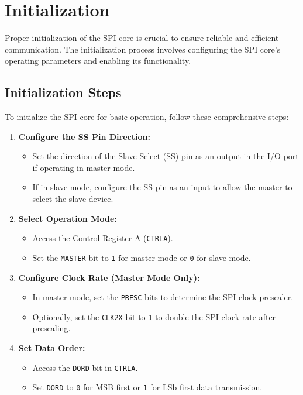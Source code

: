 \documentclass{article}
\begin{document}
\section{Initialization}
Proper initialization of the SPI core is crucial to ensure reliable and efficient communication. The initialization process involves configuring the SPI core's operating parameters and enabling its functionality.

\subsection{Initialization Steps}
To initialize the SPI core for basic operation, follow these comprehensive steps:

\begin{enumerate}
    \item \textbf{Configure the SS Pin Direction:}
    \begin{itemize}
        \item Set the direction of the Slave Select (SS) pin as an output in the I/O port if operating in master mode.
        \item If in slave mode, configure the SS pin as an input to allow the master to select the slave device.
    \end{itemize}
    
    \item \textbf{Select Operation Mode:}
    \begin{itemize}
        \item Access the Control Register A (\texttt{CTRLA}).
        \item Set the \texttt{MASTER} bit to \texttt{1} for master mode or \texttt{0} for slave mode.
    \end{itemize}
    
    \item \textbf{Configure Clock Rate (Master Mode Only):}
    \begin{itemize}
        \item In master mode, set the \texttt{PRESC} bits to determine the SPI clock prescaler.
        \item Optionally, set the \texttt{CLK2X} bit to \texttt{1} to double the SPI clock rate after prescaling.
    \end{itemize}
    
    \item \textbf{Set Data Order:}
    \begin{itemize}
        \item Access the \texttt{DORD} bit in \texttt{CTRLA}.
        \item Set \texttt{DORD} to \texttt{0} for MSB first or \texttt{1} for LSb first data transmission.
    \end{itemize}
    

\end{enumerate}
\end{document}
